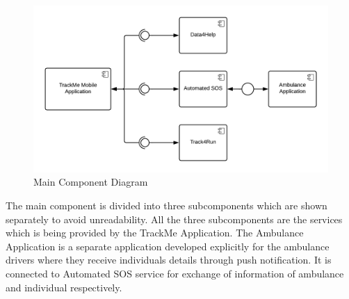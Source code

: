 \begin{figure}[H]
	\begin{center}
		\includegraphics[width=\textwidth]{./DD_Diagrams/Component.png}
      \caption{Main Component Diagram}
        \label{TrackMe_c0}
	\end{center}
\end{figure}
The main component is divided into three subcomponents which are shown separately to avoid unreadability. All the three subcomponents are the services which is being provided by the TrackMe Application.\newline
The Ambulance Application is a separate application developed explicitly for the ambulance drivers where they receive individuals details through push notification. It is connected to Automated SOS service for exchange of information of ambulance and individual respectively.